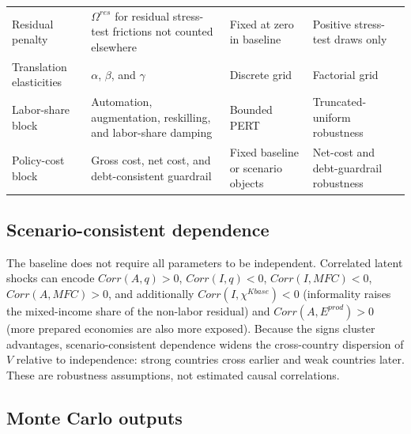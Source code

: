 \documentclass[11pt,a4paper]{article}
\begin{document}
\begin{footnotesize}
\begin{longtable}{>{\raggedright\arraybackslash}p{}>{\raggedright\arraybackslash}p{}>{\raggedright\arraybackslash}p{}>{\raggedright\arraybackslash}p{}}
Residual penalty & $\Omega^{res}$ for residual stress-test frictions not counted elsewhere & Fixed at zero in baseline & Positive stress-test draws only \\
Translation elasticities & $\alpha$, $\beta$, and $\gamma$ & Discrete grid & Factorial grid \\
Labor-share block & Automation, augmentation, reskilling, and labor-share damping & Bounded PERT & Truncated-uniform robustness \\
Policy-cost block & Gross cost, net cost, and debt-consistent guardrail & Fixed baseline or scenario objects & Net-cost and debt-guardrail robustness \\
\bottomrule
\end{longtable}
\end{footnotesize}

\subsection{Scenario-consistent dependence}

The baseline does not require all parameters to be independent. Correlated latent shocks can encode $Corr(A,q)>0$, $Corr(I,q)<0$, $Corr(I,MFC)<0$, $Corr(A,MFC)>0$, and additionally $Corr(I,\chi^{Kbase})<0$ (informality raises the mixed-income share of the non-labor residual) and $Corr(A,E^{prod})>0$ (more prepared economies are also more exposed). Because the signs cluster advantages, scenario-consistent dependence widens the cross-country dispersion of $V$ relative to independence: strong countries cross earlier and weak countries later. These are robustness assumptions, not estimated causal correlations.

\subsection{Monte Carlo outputs}
\end{document}
